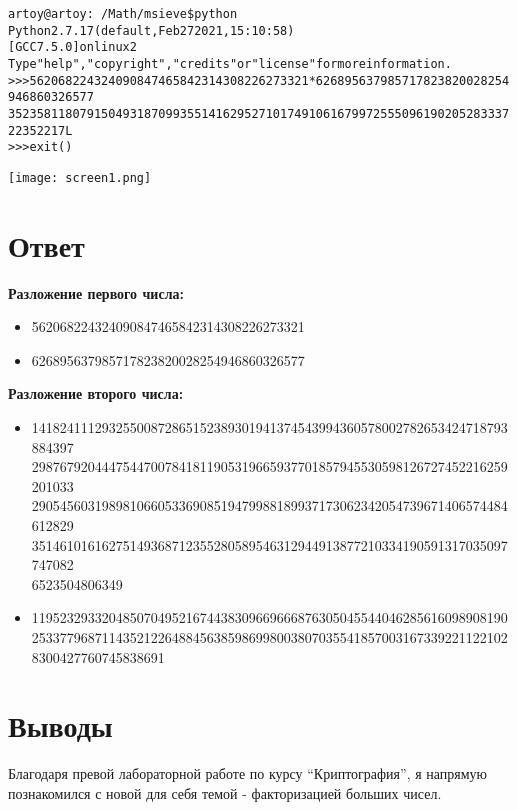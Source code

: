 \documentclass[pdf, unicode, 12pt, a4paper,oneside,fleqn]{article}
\begin{document}
\begin{alltt}
artoy@artoy:~/Math/msieve\$ python
Python 2.7.17 (default, Feb 27 2021, 15:10:58) 
[GCC 7.5.0] on linux2
Type "help", "copyright", "credits" or "license" for more information.
>>> 562068224324090847465842314308226273321 * 626895637985717823820028254946860326577
352358118079150493187099355141629527101749106167997255509619020528333722352217L
>>> exit()
\end{alltt}

\texttt{[image: screen1.png]}

\pagebreak

\section{Ответ}
{\bfseries Разложение первого числа:}
\begin{itemize}
    \item 562068224324090847465842314308226273321
    \item 626895637985717823820028254946860326577
\end{itemize}


{\bfseries Разложение второго числа:}
\begin{itemize}
    \item 
    14182411129325500872865152389301941374543994360578002782653424718793884397\\
    29876792044475447007841811905319665937701857945530598126727452216259201033\\
    29054560319898106605336908519479988189937173062342054739671406574484612829\\
    35146101616275149368712355280589546312944913877210334190591317035097747082\\
    6523504806349
    \item 11952329332048507049521674438309669666876305045544046285616098908190\\
    25337796871143521226488456385986998003807035541857003167339221122102\\
    8300427760745838691
\end{itemize}

\pagebreak

\section{Выводы}



Благодаря превой лабораторной работе по курсу \enquote{Криптография}, я напрямую познакомился с новой для себя темой - факторизацией больших чисел.  \\
\end{document}
